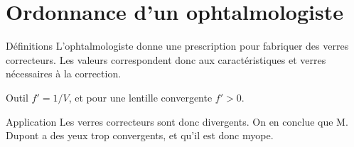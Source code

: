 \documentclass[../main/main.tex]{subfiles}
\begin{document}
\section{Ordonnance d'un ophtalmologiste}
\begin{tcbraster}[raster columns=3, raster equal height=rows]
    \begin{NCdefi}{Définitions}
        L'ophtalmologiste donne une prescription pour fabriquer des verres
        correcteurs. Les valeurs correspondent donc aux caractéristiques et
        verres nécessaires à la correction.
    \end{NCdefi}
    \begin{NCdemo}{Outil}
        $f' = 1/V$, et pour une lentille convergente $f' > 0$.
    \end{NCdemo}
    \begin{NCexem}{Application}
        Les verres correcteurs sont donc divergents. On en conclue que M. Dupont
        a des yeux trop convergents, et qu'il est donc myope.
    \end{NCexem}
\end{tcbraster}
\end{document}
